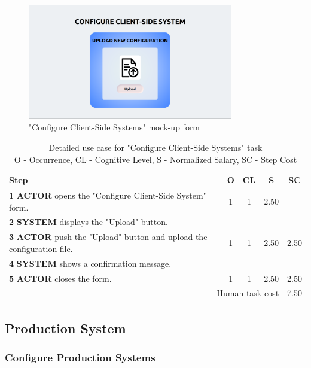 \begin{figure}[H]
\centering
\includegraphics[width=0.8\textwidth]{figures/ui_configure_client-side.png}
\caption{"Configure Client-Side Systems" mock-up form}
\end{figure}

\begin{table}[H]
\centering
\begin{tabularx}{\textwidth}{|X|c|c|c|c|}
\hline
\textbf{Step} & \textbf{O} & \textbf{CL} & \textbf{S} & \textbf{SC} \\
\hline
\textbf{1} \textbf{ACTOR} opens the "Configure Client-Side System" form. & 1 &1 & 2.50 & \\
\hline
\textbf{2} \textbf{SYSTEM} displays the "Upload" button.& & & & \\
\hline
\textbf{3} \textbf{ACTOR} push the "Upload" button and upload the configuration file. & 1 & 1 & 2.50 & 2.50 \\
\hline
\textbf{4} \textbf{SYSTEM} shows a confirmation message. & & & & \\
\hline
\textbf{5} \textbf{ACTOR} closes the form. & 1 & 1 & 2.50 & 2.50 \\
\hline
\multicolumn{4}{|r|}{Human task cost} & 7.50 \\
\hline
\end{tabularx}
\caption{Detailed use case for "Configure Client-Side Systems" task\\ 
O - Occurrence, CL - Cognitive Level, S - Normalized Salary, SC - Step Cost}
\label{table:configure_client_side}
\end{table}


\subsection{Production System}

\subsubsection{Configure Production Systems}

